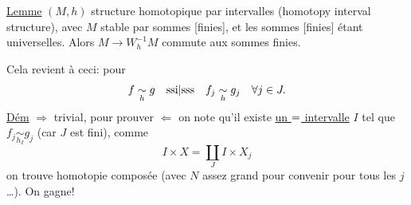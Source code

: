 \uline{Lemme}  $(M,h)$ structure homotopique par intervalles (homotopy interval structure), avec $M$ stable par sommes [finies], et les sommes [finies] étant universelles. Alors $M\longrightarrow W_h^{-1}M$ commute aux sommes finies.


Cela revient à ceci: pour
\margin{$\vert$}
\[
f\underset h\sim g\quad\text{ssi}|\text{sss}\quad f_j\underset h\sim g_j\quad\forall j\in J.
\]
\uline{Dém} $\Rightarrow$ trivial, pour prouver $\Leftarrow$ on note qu'il existe \uline{un $=$ intervalle} $I$ tel que $f_j\underset{h_I}\sim g_j$  (car $J$ est fini),  comme
\[
I\times X=\coprod_J I\times X_j
\]
on trouve homotopie composée
(avec $N$ assez grand pour convenir pour tous les $j$\ldots). On gagne!
